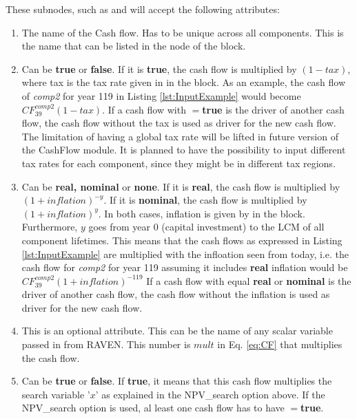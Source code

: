 \begin{enumerate}
  These subnodes, such as  and  will accept the following attributes:
  \begin{enumerate}
    \item[\xmlAttr{name}] The name of the Cash flow. Has to be unique across all components. This is the name that can be listed in the
       node of the  block.
    \item[\xmlAttr{tax}] Can be \textbf{true} or \textbf{false}. If it is \textbf{true}, the cash flow is multiplied by $(1-tax)$, where tax
      is the tax rate given in  in the 
      block. As an example, the cash flow of \textit{comp2} for year 119 in Listing \ref{lst:InputExample} would become $CF^{comp2}_{39}(1-tax)$.
      If a cash flow with $=$\textbf{true} is the driver of another cash flow, the cash flow without the tax is used as driver for the new cash flow.
      The limitation of having a global tax rate will be lifted in future version of the CashFlow module. It is planned to have the possibility to
      input different tax rates for each component, since they might be in different tax regions.
    \item[\xmlAttr{inflation}] Can be \textbf{real, nominal} or \textbf{none}. If it is \textbf{real}, the cash flow is multiplied by
      $(1+inflation)^{-y}$. If it is \textbf{nominal}, the cash flow is multiplied by $(1+inflation)^y$.
      In both cases, inflation is given by  in the  block. Furthermore, $y$ goes from year 0 (capital investment)
      to the LCM of all component lifetimes.
      This means that the cash flows as expressed in Listing \ref{lst:InputExample} are multiplied with the infloation seen from today, i.e. the cash
      flow for \textit{comp2} for year 119 assuming it includes \textbf{real}
      inflation would be $CF^{comp2}_{39}(1+inflation)^{-119}$
      If a cash flow with  equal \textbf{real} or \textbf{nominal} is the driver of another cash flow, the cash flow without
      the inflation is used as driver for the new cash flow.
    \item[\xmlAttr{multiply}] This is an optional attribute. This can be the name of any scalar variable passed in from RAVEN. This number
      is $mult$ in Eq. \ref{eq:CF} that multiplies the cash flow.
    \item[\xmlAttr{mult\_target}] Can be \textbf{true} or \textbf{false}. If \textbf{true}, it means that this cash flow multiplies
      the search variable '$x$' as explained in the NPV\_search option above.
      If the NPV\_search option is used, al least one cash flow has to have $=$\textbf{true}.
  \end{enumerate}




\end{enumerate}

